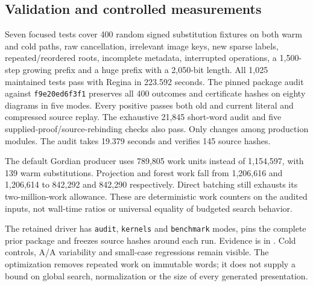 \subsection{Validation and controlled measurements}

Seven focused tests cover 400 random signed substitution fixtures on both
warm and cold paths, raw cancellation, irrelevant image keys, new sparse
labels, repeated/reordered roots, incomplete metadata, interrupted operations,
a 1,500-step growing prefix and a huge prefix with a 2,050-bit length.
All 1,025 maintained tests pass with Regina in 223.592 seconds.
The pinned package audit against \texttt{f9e20ed6f3f1} preserves all 400
outcomes and certificate hashes on eighty diagrams in five modes. Every
positive passes both old and current literal and compressed source replay.
The exhaustive 21,845 short-word audit and five supplied-proof/source-rebinding
checks also pass. Only  changes among production
modules. The audit takes 19.379 seconds and verifies 145 source hashes.

The default Gordian producer uses 789,805 work units instead of 1,154,597,
with 139 warm substitutions. Projection and forest work fall from 1,206,616
and 1,206,614 to 842,292 and 842,290 respectively. Direct batching still
exhausts its two-million-work allowance. These are deterministic work
counters on the audited inputs, not wall-time ratios or universal equality
of budgeted search behavior.



The retained driver 
has \texttt{audit}, \texttt{kernels} and \texttt{benchmark} modes, pins the
complete prior package and freezes source hashes around each run. Evidence
is in . Cold controls, A/A variability and
small-case regressions remain visible. The optimization removes repeated
work on immutable words; it does not supply a bound on global search,
normalization or the size of every generated presentation.
